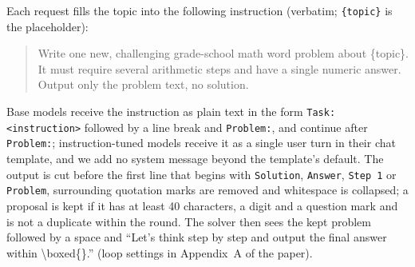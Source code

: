 \documentclass[10pt,a4paper]{article}
\begin{document}
Each request fills the topic into the following instruction (verbatim; \texttt{\{topic\}} is the placeholder):

\begin{quote}\raggedright\ttfamily\small
Write one new, challenging grade-school math word problem about \{topic\}. It must require several arithmetic steps and have a single numeric answer. Output only the problem text, no solution.
\end{quote}

Base models receive the instruction as plain text in the form \texttt{Task: <instruction>} followed by a line break and \texttt{Problem:}, and continue after \texttt{Problem:}; instruction-tuned models receive it as a single user turn in their chat template, and we add no system message beyond the template's default. The output is cut before the first line that begins with \texttt{Solution}, \texttt{Answer}, \texttt{Step 1} or \texttt{Problem}, surrounding quotation marks are removed and whitespace is collapsed; a proposal is kept if it has at least 40 characters, a digit and a question mark and is not a duplicate within the round. The solver then sees the kept problem followed by a space and ``Let's think step by step and output the final answer within \textbackslash boxed\{\}.'' (loop settings in Appendix~A of the paper).
\end{document}
